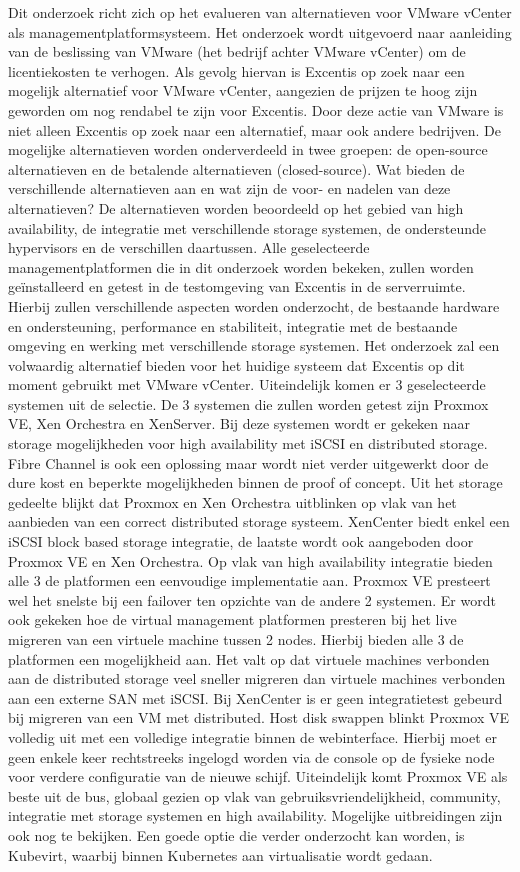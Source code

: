 Dit onderzoek richt zich op het evalueren van alternatieven voor VMware vCenter als managementplatformsysteem. Het onderzoek wordt uitgevoerd naar aanleiding van de beslissing van VMware (het bedrijf achter VMware vCenter) om de licentiekosten te verhogen. Als gevolg hiervan is Excentis op zoek naar een mogelijk alternatief voor VMware vCenter, aangezien de prijzen te hoog zijn geworden om nog rendabel te zijn voor Excentis. Door deze actie van VMware is niet alleen Excentis op zoek naar een alternatief, maar ook andere bedrijven.
De mogelijke alternatieven worden onderverdeeld in twee groepen: de open-source alternatieven en de betalende alternatieven (closed-source). Wat bieden de verschillende alternatieven aan en wat zijn de voor- en nadelen van deze alternatieven? De alternatieven worden beoordeeld op het gebied van high availability, de integratie met verschillende storage systemen, de ondersteunde hypervisors en de verschillen daartussen.
Alle geselecteerde managementplatformen die in dit onderzoek worden bekeken, zullen worden geïnstalleerd en getest in de testomgeving van Excentis in de serverruimte. Hierbij zullen verschillende aspecten worden onderzocht, de bestaande hardware en ondersteuning, performance en stabiliteit, integratie met de bestaande omgeving en werking met verschillende storage systemen. Het onderzoek zal een volwaardig alternatief bieden voor het huidige systeem dat Excentis op dit moment gebruikt met VMware vCenter.
Uiteindelijk komen er 3 geselecteerde systemen uit de selectie. De 3 systemen die zullen worden getest zijn Proxmox VE, Xen Orchestra en XenServer.
Bij deze systemen wordt er gekeken naar storage mogelijkheden voor high availability met iSCSI en distributed storage. Fibre Channel is ook een oplossing maar wordt niet verder uitgewerkt door de dure kost en beperkte mogelijkheden binnen de proof of concept.
Uit het storage gedeelte blijkt dat Proxmox en Xen Orchestra uitblinken op vlak van het aanbieden van een correct distributed storage systeem. XenCenter biedt enkel een iSCSI block based storage integratie, de laatste wordt ook aangeboden door Proxmox VE en Xen Orchestra.
Op vlak van high availability integratie bieden alle 3 de platformen een eenvoudige implementatie aan. Proxmox VE presteert wel het snelste bij een failover ten opzichte van de andere 2 systemen.
Er wordt ook gekeken hoe de virtual management platformen presteren bij het live migreren van een virtuele machine tussen 2 nodes. Hierbij bieden alle 3 de platformen een mogelijkheid aan.
Het valt op dat virtuele machines verbonden aan de distributed storage veel sneller migreren dan virtuele machines verbonden aan een externe SAN met iSCSI. Bij XenCenter is er geen integratietest gebeurd bij migreren van een VM met distributed.
Host disk swappen blinkt Proxmox VE volledig uit met een volledige integratie binnen de webinterface. Hierbij moet er geen enkele keer rechtstreeks ingelogd worden via de console op de fysieke node voor verdere configuratie van de nieuwe schijf.
Uiteindelijk komt Proxmox VE als beste uit de bus, globaal gezien op vlak van gebruiksvriendelijkheid, community, integratie met storage systemen en high availability.
Mogelijke uitbreidingen zijn ook nog te bekijken. Een goede optie die verder onderzocht kan worden, is Kubevirt, waarbij binnen Kubernetes aan virtualisatie wordt gedaan.